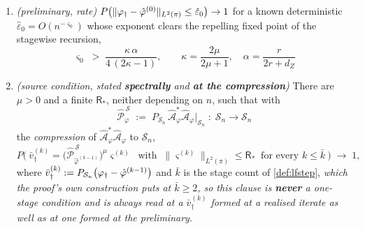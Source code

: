 \begin{proposition}
\begin{enumerate}
\begin{enumerate}
\item[(P-a.2)] \emph{(preliminary, rate)} $P\big(\|\varphi_{\dagger}-\hat\varphi^{(0)}\|_{L^{2}(\pi)}\le\hat\varepsilon_0\big)\to1$
for a known deterministic $\hat\varepsilon_0=O(n^{-\varsigma_0})$ whose exponent clears the repelling
fixed point of the stagewise recursion,
\[
\varsigma_0\;>\;\frac{\kappa\,\alpha}{4\,(2\kappa-1)},
\qquad \kappa=\frac{2\mu}{2\mu+1},\quad\alpha=\frac{r}{2r+d_Z}
\]
\item[(P-a.3)] \emph{(source condition, stated \textbf{spectrally} and \textbf{at the compression})}
There are $\mu>0$ and a finite $\mathsf R_\ast$, neither depending on $n$, such that with
\begin{equation}\label{eq:compress}
\hat{\mathcal P}^{\,\mathcal S}_{\varphi}\;:=\;P_{\mathcal S_n}\,\hat{\mathcal A}^{\ast}_{\varphi}\hat{\mathcal A}_{\varphi}\big\vert_{\mathcal S_n}
\;:\;\mathcal S_n\to\mathcal S_n
\end{equation}
the \emph{compression} of $\hat{\mathcal A}^{\ast}_{\varphi}\hat{\mathcal A}_{\varphi}$ to
$\mathcal S_n$,
\[
P\Big(\ \bar v^{(k)}_\dagger=\big(\hat{\mathcal P}^{\,\mathcal S}_{\hat\varphi^{(k-1)}}\big)^{\mu}\varsigma^{(k)}
\ \text{ with }\ \big\|\varsigma^{(k)}\big\|_{L^{2}(\pi)}\le\mathsf R_\ast
\ \text{ for every }k\le\bar k\ \Big)\;\longrightarrow\;1 ,
\]
where $\bar v^{(k)}_\dagger:=P_{\mathcal S_n}\big(\varphi_{\dagger}-\hat\varphi^{(k-1)}\big)$ and $\bar k$ is the
stage count of \cref{def:lfstep}, \emph{which the proof's own construction puts at $\bar k\ge2$, so this
clause is \textbf{never} a one-stage condition and is always read at a $\bar v^{(k)}_\dagger$ formed at a
realised iterate as well as at one formed at the preliminary}.
\end{enumerate}

\end{enumerate}
\end{proposition}
